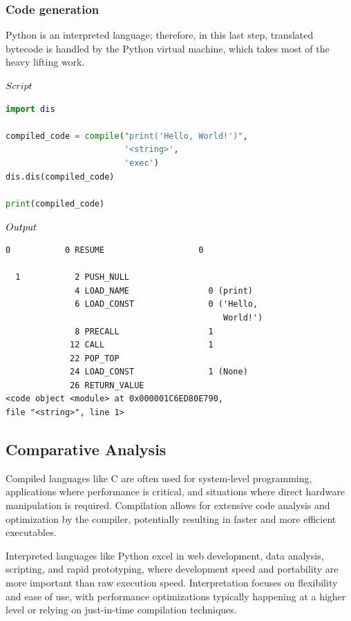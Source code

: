 \documentclass[journal]{IEEEtran}
\begin{document}
\subsubsection{Code generation}
Python is an interpreted language; therefore, in this last step, translated bytecode is handled by the Python virtual machine, which takes most of the heavy lifting work.

$\\{Script}$

\begin{lstlisting}[language=Python, breaklines=true, basicstyle=\footnotesize, frame=single]
import dis

compiled_code = compile("print('Hello, World!')",
                        '<string>',
                        'exec')
dis.dis(compiled_code)

print(compiled_code)
\end{lstlisting}
$\\{Output}$
\begin{lstlisting}[breaklines=true, basicstyle=\footnotesize, frame=single]
  0           0 RESUME                   0

  1           2 PUSH_NULL
              4 LOAD_NAME                0 (print)
              6 LOAD_CONST               0 ('Hello, 
                                            World!')
              8 PRECALL                  1
             12 CALL                     1
             22 POP_TOP
             24 LOAD_CONST               1 (None)
             26 RETURN_VALUE
<code object <module> at 0x000001C6ED80E790, 
file "<string>", line 1>
\end{lstlisting}

\subsection{Comparative Analysis}

Compiled languages like C are often used for system-level programming, applications where performance is critical, and situations where direct hardware manipulation is required. Compilation allows for extensive code analysis and optimization by the compiler, potentially resulting in faster and more efficient executables.

Interpreted languages like Python excel in web development, data analysis, scripting, and rapid prototyping, where development speed and portability are more important than raw execution speed. Interpretation focuses on flexibility and ease of use, with performance optimizations typically happening at a higher level or relying on just-in-time compilation techniques.
\end{document}
